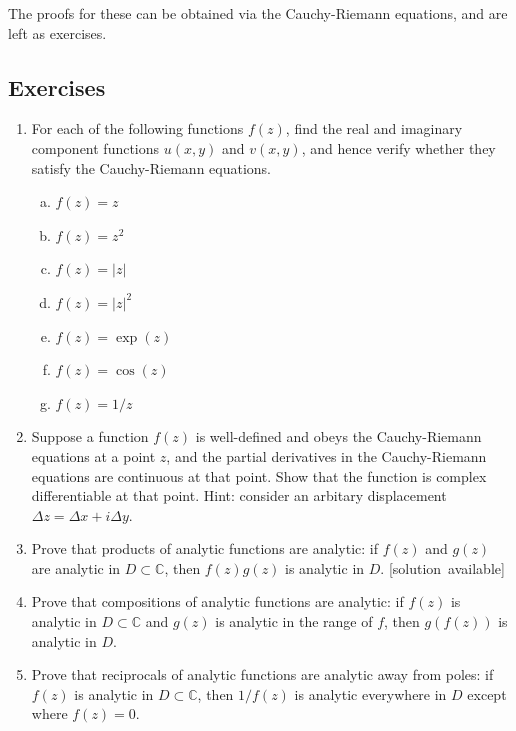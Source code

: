 \documentclass[10pt,a4paper]{article}
\begin{document}
\noindent
The proofs for these can be obtained via the Cauchy-Riemann equations,
and are left as exercises.

\subsection{Exercises}
\label{exercises}

\begin{enumerate}
\item
  For each of the following functions $f(z)$, find the real and
  imaginary component functions $u(x,y)$ and $v(x,y)$, and hence
  verify whether they satisfy the Cauchy-Riemann equations.

  \begin{enumerate}[(a)]
  \item $f(z) = z$
  \item $f(z) = z^2$
  \item $f(z) = |z|$
  \item $f(z) = |z|^2$
  \item $f(z) = \exp(z)$
  \item $f(z) = \cos(z)$
  \item $f(z) = 1/z$
  \end{enumerate}

\item
  Suppose a function $f(z)$ is well-defined and obeys the
  Cauchy-Riemann equations at a point $z$, and the partial derivatives
  in the Cauchy-Riemann equations are continuous at that point. Show
  that the function is complex differentiable at that point. Hint:
  consider an arbitary displacement
  $\Delta z = \Delta x + i \Delta y$.

\item
  Prove that products of analytic functions are analytic: if $f(z)$
  and $g(z)$ are analytic in $D \subset \mathbb{C}$, then
  $f(z) g(z)$ is analytic in $D$.
  \hfill{\scriptsize [solution~available]}

\item
  Prove that compositions of analytic functions are analytic: if
  $f(z)$ is analytic in $D \subset \mathbb{C}$ and $g(z)$ is
  analytic in the range of $f$, then $g(f(z))$ is analytic in $D$.

\item
  Prove that reciprocals of analytic functions are analytic away from
  poles: if $f(z)$ is analytic in $D \subset \mathbb{C}$, then
  $1/f(z)$ is analytic everywhere in $D$ except where $f(z) = 0$.


\end{enumerate}
\end{document}

